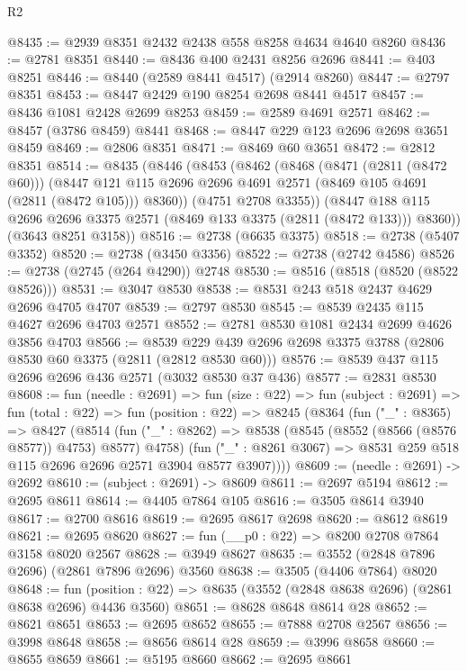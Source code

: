 \begin{lexlean}{R2}
\begin{coremodule}
@8435 := @2939 @8351 @2432 @2438 @558 @8258 @4634 @4640 @8260
@8436 := @2781 @8351
@8440 := @8436 @400 @2431 @8256 @2696
@8441 := @403 @8251
@8446 := @8440 (@2589 @8441 @4517) (@2914 @8260)
@8447 := @2797 @8351
@8453 := @8447 @2429 @190 @8254 @2698 @8441 @4517
@8457 := @8436 @1081 @2428 @2699 @8253
@8459 := @2589 @4691 @2571
@8462 := @8457 (@3786 @8459) @8441
@8468 := @8447 @229 @123 @2696 @2698 @3651 @8459
@8469 := @2806 @8351
@8471 := @8469 @60 @3651
@8472 := @2812 @8351
@8514 := @8435
    (@8446
      (@8453
        (@8462
          (@8468
            (@8471 (@2811 (@8472 @60)))
            (@8447 @121 @115 @2696 @2696 @4691 @2571 (@8469 @105 @4691 (@2811 (@8472 @105))) @8360))
          (@4751 @2708 @3355))
        (@8447 @188 @115 @2696 @2696 @3375 @2571 (@8469 @133 @3375 (@2811 (@8472 @133))) @8360))
      (@3643 @8251 @3158))
@8516 := @2738 (@6635 @3375)
@8518 := @2738 (@5407 @3352)
@8520 := @2738 (@3450 @3356)
@8522 := @2738 (@2742 @4586)
@8526 := @2738 (@2745 (@264 @4290)) @2748
@8530 := @8516 (@8518 (@8520 (@8522 @8526)))
@8531 := @3047 @8530
@8538 := @8531 @243 @518 @2437 @4629 @2696 @4705 @4707
@8539 := @2797 @8530
@8545 := @8539 @2435 @115 @4627 @2696 @4703 @2571
@8552 := @2781 @8530 @1081 @2434 @2699 @4626 @3856 @4703
@8566 := @8539 @229 @439 @2696 @2698 @3375 @3788 (@2806 @8530 @60 @3375 (@2811 (@2812 @8530 @60)))
@8576 := @8539 @437 @115 @2696 @2696 @436 @2571 (@3032 @8530 @37 @436)
@8577 := @2831 @8530
@8608 := fun (needle : @2691) =>
  fun (size : @22) =>
  fun (subject : @2691) =>
  fun (total : @22) =>
  fun (position : @22) =>
  @8245
    (@8364
      (fun ("_" : @8365) =>
      @8427
        (@8514
          (fun ("_" : @8262) => @8538 (@8545 (@8552 (@8566 (@8576 @8577)) @4753) @8577) @4758)
          (fun ("_" : @8261 @3067) => @8531 @259 @518 @115 @2696 @2696 @2571 @3904 @8577 @3907))))
@8609 := (needle : @2691) -> @2692
@8610 := (subject : @2691) -> @8609
@8611 := @2697 @5194
@8612 := @2695 @8611
@8614 := @4405 @7864 @105
@8616 := @3505 @8614 @3940
@8617 := @2700 @8616
@8619 := @2695 @8617 @2698
@8620 := @8612 @8619
@8621 := @2695 @8620
@8627 := fun (__p0 : @22) => @8200 @2708 @7864 @3158 @8020 @2567
@8628 := @3949 @8627
@8635 := @3552 (@2848 @7896 @2696) (@2861 @7896 @2696) @3560
@8638 := @3505 (@4406 @7864) @8020
@8648 := fun (position : @22) => @8635 (@3552 (@2848 @8638 @2696) (@2861 @8638 @2696) @4436 @3560)
@8651 := @8628 @8648 @8614 @28
@8652 := @8621 @8651
@8653 := @2695 @8652
@8655 := @7888 @2708 @2567
@8656 := @3998 @8648
@8658 := @8656 @8614 @28
@8659 := @3996 @8658
@8660 := @8655 @8659
@8661 := @5195 @8660
@8662 := @2695 @8661

\end{coremodule}
\end{lexlean}
